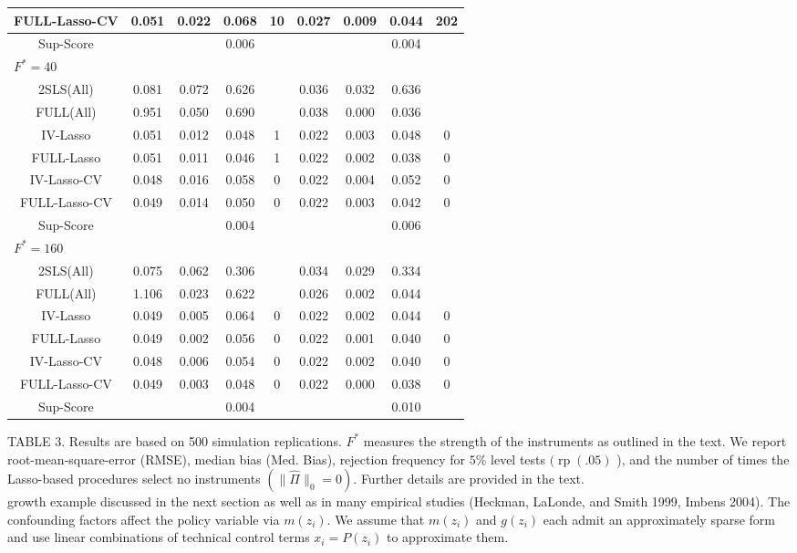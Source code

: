\documentclass[10pt]{article}
\begin{document}
\begin{center}
\begin{tabular}{|c|c|c|c|c|c|c|c|c|}
FULL-Lasso-CV & 0.051 & 0.022 & 0.068 & 10 & 0.027 & 0.009 & 0.044 & 202 \\
\hline
Sup-Score &  &  & 0.006 &  &  &  & 0.004 &  \\
\hline
\multicolumn{9}{|l|}{\(F^{*}=40\)} \\
\hline
2SLS(All) & 0.081 & 0.072 & 0.626 &  & 0.036 & 0.032 & 0.636 &  \\
\hline
FULL(All) & 0.951 & 0.050 & 0.690 &  & 0.038 & 0.000 & 0.036 &  \\
\hline
IV-Lasso & 0.051 & 0.012 & 0.048 & 1 & 0.022 & 0.003 & 0.048 & 0 \\
\hline
FULL-Lasso & 0.051 & 0.011 & 0.046 & 1 & 0.022 & 0.002 & 0.038 & 0 \\
\hline
IV-Lasso-CV & 0.048 & 0.016 & 0.058 & 0 & 0.022 & 0.004 & 0.052 & 0 \\
\hline
FULL-Lasso-CV & 0.049 & 0.014 & 0.050 & 0 & 0.022 & 0.003 & 0.042 & 0 \\
\hline
Sup-Score &  &  & 0.004 &  &  &  & 0.006 &  \\
\hline
\multicolumn{9}{|l|}{\(F^{*}=160\)} \\
\hline
2SLS(All) & 0.075 & 0.062 & 0.306 &  & 0.034 & 0.029 & 0.334 &  \\
\hline
FULL(All) & 1.106 & 0.023 & 0.622 &  & 0.026 & 0.002 & 0.044 &  \\
\hline
IV-Lasso & 0.049 & 0.005 & 0.064 & 0 & 0.022 & 0.002 & 0.044 & 0 \\
\hline
FULL-Lasso & 0.049 & 0.002 & 0.056 & 0 & 0.022 & 0.001 & 0.040 & 0 \\
\hline
IV-Lasso-CV & 0.048 & 0.006 & 0.054 & 0 & 0.022 & 0.002 & 0.040 & 0 \\
\hline
FULL-Lasso-CV & 0.049 & 0.003 & 0.048 & 0 & 0.022 & 0.000 & 0.038 & 0 \\
\hline
Sup-Score &  &  & 0.004 &  &  &  & 0.010 &  \\
\hline
\end{tabular}
\end{center}

TABLE 3. Results are based on 500 simulation replications. \(F^{*}\) measures the strength of the instruments as outlined in the text. We report root-mean-square-error (RMSE), median bias (Med. Bias), rejection frequency for \(5 \%\) level tests \((\operatorname{rp}(.05)\) ), and the number of times the Lasso-based procedures select no instruments \(\left(\|\widehat{\Pi}\|_{0}=0\right)\). Further details are provided in the text.\\
growth example discussed in the next section as well as in many empirical studies (Heckman, LaLonde, and Smith 1999, Imbens 2004). The confounding factors affect the policy variable via \(m\left(z_{i}\right)\). We assume that \(m\left(z_{i}\right)\) and \(g\left(z_{i}\right)\) each admit an approximately sparse form and use linear combinations of technical control terms \(x_{i}=P\left(z_{i}\right)\) to approximate them.
\end{document}
